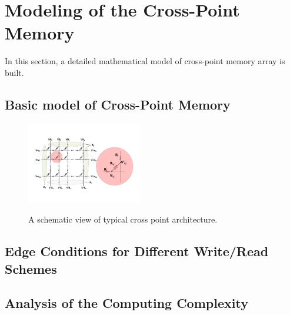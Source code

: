\vspace{10pt}
\section{Modeling of the Cross-Point Memory}\label{sec:model}
In this section, a detailed mathematical model of cross-point memory array is built.

\subsection{Basic model of Cross-Point Memory}

\begin{figure}
\centering
  \includegraphics[width=0.45\textwidth]{./figures/model.pdf}\\
  \caption{A schematic view of typical cross point architecture.}\label{fig:array}
\end{figure}
\subsection{Edge Conditions for Different Write/Read Schemes}

\subsection{Analysis of the Computing Complexity}
